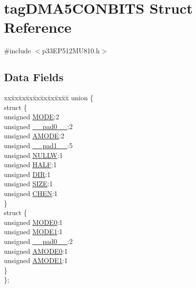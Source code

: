 \hypertarget{structtag_d_m_a5_c_o_n_b_i_t_s}{}\section{tag\+D\+M\+A5\+C\+O\+N\+B\+I\+TS Struct Reference}
\label{structtag_d_m_a5_c_o_n_b_i_t_s}


{\ttfamily \#include $<$p33\+E\+P512\+M\+U810.\+h$>$}

\subsection*{Data Fields}
\begin{DoxyCompactItemize}
\item 
\begin{tabbing}
xx\=xx\=xx\=xx\=xx\=xx\=xx\=xx\=xx\=\kill
union \{\\
\>struct \{\\
\>\>unsigned \hyperlink{structtag_d_m_a5_c_o_n_b_i_t_s_adc56ba18ff3f1599c85d222bee624424}{MODE}:2\\
\>\>unsigned \hyperlink{structtag_d_m_a5_c_o_n_b_i_t_s_adf71f3d8410c1f1dbbc96680a92c49af}{\_\_pad0\_\_}:2\\
\>\>unsigned \hyperlink{structtag_d_m_a5_c_o_n_b_i_t_s_ab3ff4e1f1b9a1037418ca7b6cb2e8f77}{AMODE}:2\\
\>\>unsigned \hyperlink{structtag_d_m_a5_c_o_n_b_i_t_s_acaf2d0924a107ec6e8d2e31febaf66f9}{\_\_pad1\_\_}:5\\
\>\>unsigned \hyperlink{structtag_d_m_a5_c_o_n_b_i_t_s_a1d3f7d04416314131889d1671a9287ad}{NULLW}:1\\
\>\>unsigned \hyperlink{structtag_d_m_a5_c_o_n_b_i_t_s_a1a715a64b2576f59401ac93d6f9a086a}{HALF}:1\\
\>\>unsigned \hyperlink{structtag_d_m_a5_c_o_n_b_i_t_s_ad6868749602045a76f36ffdf964dfd39}{DIR}:1\\
\>\>unsigned \hyperlink{structtag_d_m_a5_c_o_n_b_i_t_s_a5863cac6dc2cb330bdd0b1c66da70ffe}{SIZE}:1\\
\>\>unsigned \hyperlink{structtag_d_m_a5_c_o_n_b_i_t_s_a092934036fdfb8df5259db288fe438ca}{CHEN}:1\\
\>\} \\
\>struct \{\\
\>\>unsigned \hyperlink{structtag_d_m_a5_c_o_n_b_i_t_s_abc938903e74bff48935569d0c5b19035}{MODE0}:1\\
\>\>unsigned \hyperlink{structtag_d_m_a5_c_o_n_b_i_t_s_a7a9f7514566d0626724ce6c4b81b5ea2}{MODE1}:1\\
\>\>unsigned \hyperlink{structtag_d_m_a5_c_o_n_b_i_t_s_adf71f3d8410c1f1dbbc96680a92c49af}{\_\_pad0\_\_}:2\\
\>\>unsigned \hyperlink{structtag_d_m_a5_c_o_n_b_i_t_s_a0a1f894a2695c1388a5412244636805b}{AMODE0}:1\\
\>\>unsigned \hyperlink{structtag_d_m_a5_c_o_n_b_i_t_s_a3fde4abc0dc3db6fef6afc28c565ce3e}{AMODE1}:1\\
\>\} \\
\}; \\


\end{tabbing}
\end{DoxyCompactItemize}
